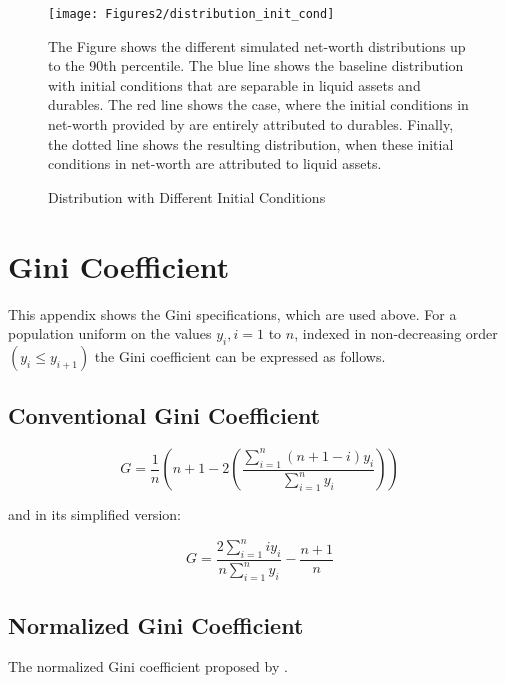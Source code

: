 \documentclass[a4paper,12pt,legno]{article}
\begin{document}
\begin{figure}[!htbp]
\caption{Distribution with Different Initial Conditions} 
\label{initial_conditions_dist}	%
\centering
\texttt{[image: Figures2/distribution\_init\_cond]}  %

\begin{minipage}{0.8\linewidth}
\footnotesize{The Figure shows the different simulated net-worth distributions up to the 90th percentile. The blue line shows the baseline distribution with initial conditions that are separable in liquid assets and durables. The red line shows the case, where the initial conditions in net-worth provided by \cite{hintermaier2011} are entirely attributed to durables. Finally, the dotted line shows the resulting distribution, when these initial conditions in net-worth are attributed to liquid assets.}
\end{minipage}

\end{figure}

\newpage

\section{Gini Coefficient}
\label{gini_defs}
This appendix shows the Gini specifications, which are used above. For a population uniform on the values $y_{i}, i=1$ to $n$, indexed in non-decreasing order $(y_{i} \leq y_{i+1})$ the Gini coefficient can be expressed as follows.  
\subsection{Conventional Gini Coefficient}

\begin{equation*}
G = \frac{1}{n} \left(n+1-2 \left( \frac{\sum_{i=1}^n (n+1-i)y_{i}}{\sum_{i=1}^n y_{i}}\right)\right)
\end{equation*}

and in its simplified version: 

\begin{equation*}
G = \frac{2\sum_{i=1}^n iy_{i}}{n \sum_{i=1}^n y_{i}} - \frac{n+1}{n}
\end{equation*}

\subsection{Normalized Gini Coefficient}
The normalized Gini coefficient proposed by \cite{chen1982}. 
\end{document}
